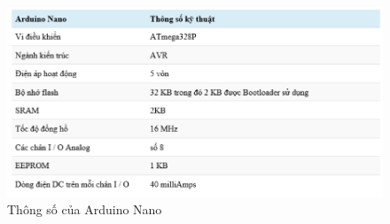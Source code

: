 \begin{figure}[H]
    \centering
    \includegraphics[width=13cm]{Images/Theoretical basis/arduino nano datasheet.png}
\caption{Thông số của Arduino Nano}
\end{figure}

